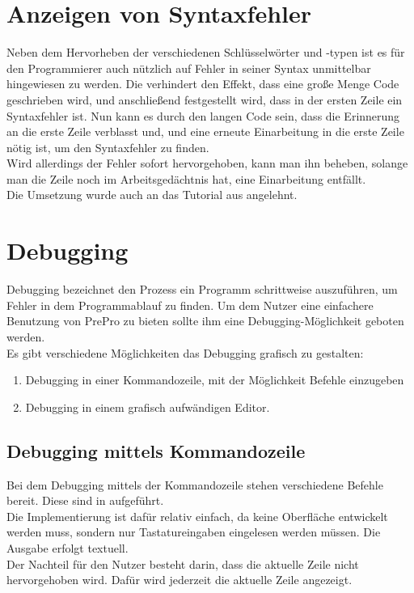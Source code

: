 \section{Anzeigen von Syntaxfehler}
Neben dem Hervorheben der verschiedenen Schlüsselwörter und -typen ist es für den Programmierer auch nützlich auf Fehler in seiner Syntax unmittelbar hingewiesen zu werden.
Die verhindert den Effekt, dass eine große Menge Code geschrieben wird, und anschließend festgestellt wird, dass in der ersten Zeile ein Syntaxfehler ist.
Nun kann es durch den langen Code sein, dass die Erinnerung an die erste Zeile verblasst und, und eine erneute Einarbeitung in die erste Zeile nötig ist, um den Syntaxfehler zu finden.\\
Wird allerdings der Fehler sofort hervorgehoben, kann man ihn beheben, solange man die Zeile noch im Arbeitsgedächtnis hat, eine Einarbeitung entfällt.\\
Die Umsetzung wurde auch an das Tutorial aus \cite{netbeansSyntax} angelehnt.

\section{Debugging}
Debugging bezeichnet den Prozess ein Programm schrittweise auszuführen, um Fehler in dem Programmablauf zu finden.
Um dem Nutzer eine einfachere Benutzung von PrePro zu bieten sollte ihm eine Debugging-Möglichkeit geboten werden.\\
Es gibt verschiedene Möglichkeiten das Debugging grafisch zu gestalten:
\begin{enumerate}
\item Debugging in einer Kommandozeile, mit der Möglichkeit Befehle einzugeben
\item Debugging in einem grafisch aufwändigen Editor.
\end{enumerate}

\subsection{Debugging mittels Kommandozeile}
Bei dem Debugging mittels der Kommandozeile stehen verschiedene Befehle bereit.
Diese sind in  aufgeführt.\\
Die Implementierung ist dafür relativ einfach, da keine Oberfläche entwickelt werden muss, sondern nur Tastatureingaben eingelesen werden müssen.
Die Ausgabe erfolgt textuell.\\
Der Nachteil für den Nutzer besteht darin, dass die aktuelle Zeile nicht hervorgehoben wird.
Dafür wird jederzeit die aktuelle Zeile angezeigt.

